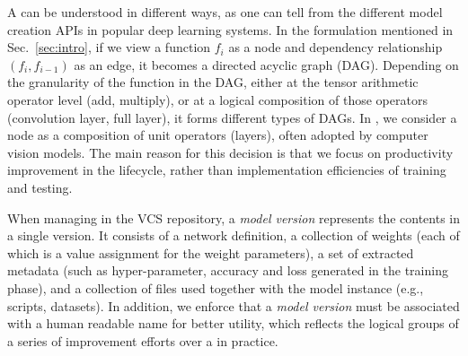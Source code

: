 \documentclass[conference]{IEEEtran}
\begin{document}
A \dnn\model can be understood in different ways, as one can tell from the different model creation APIs in popular deep learning systems. In the formulation mentioned in Sec.~\ref{sec:intro}, if we view a function $f_i$ as a node and
dependency relationship $(f_i, f_{i-1})$ as an edge, it becomes a directed acyclic graph (DAG).
Depending on the granularity of the function in the DAG, either at the tensor arithmetic operator level (add, multiply), or at a logical composition of those operators (convolution layer, full layer), it forms different types of DAGs. In \modelhub, we consider a \dnn\model node as a composition of unit operators (layers), often adopted by computer vision models. The main reason for this decision is that we focus on productivity improvement in the lifecycle, rather than implementation efficiencies of training and testing. %




When managing \dnn\models in the VCS repository, a \emph{model version} represents the contents in
a single version. It consists of a network definition, a collection of weights (each of which is a
        value assignment for the weight parameters), a set of extracted metadata (such as
            hyper-parameter, accuracy and loss generated in the training phase), and a collection
        of files used together with the model instance (e.g., scripts, datasets). In addition, we
        enforce that a \emph{model version} must be associated with a human readable name for better
        utility, which reflects the logical groups of a series of improvement efforts over a \dnn\model in practice. 
\end{document}
